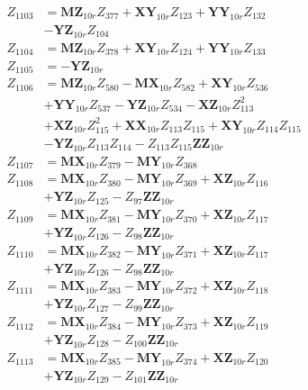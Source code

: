 \begin{multicols}{2}
\begin{align}
Z_{1103} &= \mathbf{MZ}_{10r}Z_{377} + \mathbf{XY}_{10r}Z_{123} + \mathbf{YY}_{10r}Z_{132}  \nonumber \\
&- \mathbf{YZ}_{10r}Z_{104} \nonumber \\
Z_{1104} &= \mathbf{MZ}_{10r}Z_{378} + \mathbf{XY}_{10r}Z_{124} + \mathbf{YY}_{10r}Z_{133} \nonumber \\
Z_{1105} &= -\mathbf{YZ}_{10r} \nonumber \\
Z_{1106} &= \mathbf{MZ}_{10r}Z_{580} - \mathbf{MX}_{10r}Z_{582} + \mathbf{XY}_{10r}Z_{536}  \nonumber \\
&+ \mathbf{YY}_{10r}Z_{537} - \mathbf{YZ}_{10r}Z_{534} - \mathbf{XZ}_{10r}Z_{113}^2  \nonumber \\
&+ \mathbf{XZ}_{10r}Z_{115}^2 + \mathbf{XX}_{10r}Z_{113}Z_{115} + \mathbf{XY}_{10r}Z_{114}Z_{115}  \nonumber \\
&- \mathbf{YZ}_{10r}Z_{113}Z_{114} - Z_{113}Z_{115}\mathbf{ZZ}_{10r} \nonumber \\
Z_{1107} &= \mathbf{MX}_{10r}Z_{379} - \mathbf{MY}_{10r}Z_{368} \nonumber \\
Z_{1108} &= \mathbf{MX}_{10r}Z_{380} - \mathbf{MY}_{10r}Z_{369} + \mathbf{XZ}_{10r}Z_{116}  \nonumber \\
&+ \mathbf{YZ}_{10r}Z_{125} - Z_{97}\mathbf{ZZ}_{10r} \nonumber \\
Z_{1109} &= \mathbf{MX}_{10r}Z_{381} - \mathbf{MY}_{10r}Z_{370} + \mathbf{XZ}_{10r}Z_{117}  \nonumber \\
&+ \mathbf{YZ}_{10r}Z_{126} - Z_{98}\mathbf{ZZ}_{10r} \nonumber \\
Z_{1110} &= \mathbf{MX}_{10r}Z_{382} - \mathbf{MY}_{10r}Z_{371} + \mathbf{XZ}_{10r}Z_{117}  \nonumber \\
&+ \mathbf{YZ}_{10r}Z_{126} - Z_{98}\mathbf{ZZ}_{10r} \nonumber \\
Z_{1111} &= \mathbf{MX}_{10r}Z_{383} - \mathbf{MY}_{10r}Z_{372} + \mathbf{XZ}_{10r}Z_{118}  \nonumber \\
&+ \mathbf{YZ}_{10r}Z_{127} - Z_{99}\mathbf{ZZ}_{10r} \nonumber \\
Z_{1112} &= \mathbf{MX}_{10r}Z_{384} - \mathbf{MY}_{10r}Z_{373} + \mathbf{XZ}_{10r}Z_{119}  \nonumber \\
&+ \mathbf{YZ}_{10r}Z_{128} - Z_{100}\mathbf{ZZ}_{10r} \nonumber \\
Z_{1113} &= \mathbf{MX}_{10r}Z_{385} - \mathbf{MY}_{10r}Z_{374} + \mathbf{XZ}_{10r}Z_{120}  \nonumber \\
&+ \mathbf{YZ}_{10r}Z_{129} - Z_{101}\mathbf{ZZ}_{10r} \nonumber \\

\end{align}
\end{multicols}
